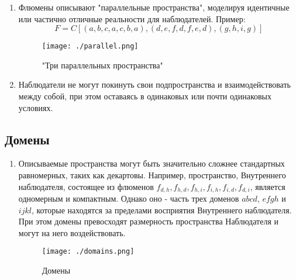 \documentclass[final]{article}
\begin{document}
            \begin{enumerate}

                \item Флюмены описывают "параллельные пространства", моделируя 
                идентичные или частично отличные реальности для наблюдателей. Пример: \[ 
                F = C[(a,b,c,a,c,b,a), (d,e,f,d,f,e,d), (g,h,i,g)] \]

                \begin{figure}[H]
                    \centering
                    \texttt{[image: ./parallel.png]}
                    \caption{"Три параллельных пространства"}
                    \label{fig:image}
                \end{figure}

                \item Наблюдатели не могут покинуть свои подпространства и 
                взаимодействовать между собой, при этом оставаясь в одинаковых или почти 
                одинаковых условиях.

            \end{enumerate}



        \subsection{Домены}

            \begin{enumerate}

                \item Описываемые пространства могут быть значительно сложнее 
                стандартных равномерных, таких как декартовы. Например, 
                пространство, Внутреннего наблюдателя, состоящее из флюменов 
                \(f_{d,h}, f_{h,d}, f_{h,i}, f_{i,h}, f_{i,d}, f_{d,i}\), является 
                одномерным и компактным. Однако оно - часть трех доменов \(abcd\), 
                \(efgh\) и \(ijkl\), которые находятся за пределами восприятия 
                Внутреннего наблюдателя. При этом домены превосходят размерность 
                пространства Наблюдателя и могут на него воздействовать.

                \begin{figure}[H]
                    \centering
                    \texttt{[image: ./domains.png]}
                    \caption{Домены}
                    \label{fig:image}
                \end{figure}

            \end{enumerate}
\end{document}

